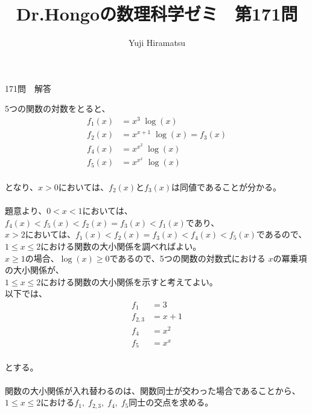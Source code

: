 \documentclass[a4j,10pt,oneside,openany]{jsbook}
\title{{\Huge \textbf{Dr.Hongoの数理科学ゼミ　第171問}}\\}
\author{Yuji Hiramatsu}
\date{}
\begin{document}
%
%
\maketitle
%
%


{\Huge 171問　解答}

\vspace{3\baselineskip}
5つの関数の対数をとると、\\
\begin{align*}
f_{1}(x) &= x^3 \; \log(x) \\
f_{2}(x) &= x^{x+1} \; \log(x) = f_{3}(x) \\
f_{4}(x) &= x^{x^2} \; \log(x) \\
f_{5}(x) &= x^{x^{x}} \; \log(x)
\end{align*}
\\
となり、$x>0$においては、$f_{2}(x)$と$f_{3}(x)$は同値であることが分かる。\\
\\
題意より、$0<x<1$においては、$f_{4}(x)<f_{5}(x)<f_{2}(x)=f_{3}(x)<f_{1}(x)$であり、\\
$x > 2$においては、$f_{1}(x)<f_{2}(x)=f_{3}(x)<f_{4}(x)<f_{5}(x)$であるので、\\
$1 \leq x \leq 2$における関数の大小関係を調べればよい。\\
$x \geq 1$の場合、$\log (x) \geq 0$であるので、5つの関数の対数式における $x$の冪乗項の大小関係が、\\
$1 \leq x \leq 2$における関数の大小関係を示すと考えてよい。\\
以下では、\\
\begin{align*}
f_{1} &= 3 \\
f_{2,3} &= x+1 \\
f_{4} &= x^2 \\
f_{5} &= x^{x}
\end{align*}
\\
とする。\\
\\
関数の大小関係が入れ替わるのは、関数同士が交わった場合であることから、\\
$1\leq x \leq 2$における$f_{1}, \; f_{2,3},\; f_{4},\; f_{5}$同士の交点を求める。\\
\end{document}
